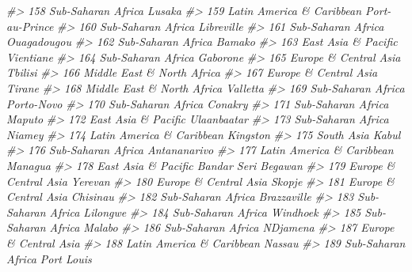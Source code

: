 \documentclass[
  xelatex, ja=standard]{bxjsbook}
\newenvironment{Shaded}{\begin{snugshade}}{\end{snugshade}}
\newcommand{\CommentTok}[1]{\textcolor[rgb]{0.56,0.35,0.01}{\textit{#1}}}
\theoremstyle{definition}
\theoremstyle{definition}
\theoremstyle{definition}
\theoremstyle{definition}
\theoremstyle{remark}
\begin{document}
\begin{Shaded}
\begin{Highlighting}[]
\CommentTok{\#\textgreater{} 158         Sub{-}Saharan Africa              Lusaka}
\CommentTok{\#\textgreater{} 159  Latin America \& Caribbean      Port{-}au{-}Prince}
\CommentTok{\#\textgreater{} 160         Sub{-}Saharan Africa          Libreville}
\CommentTok{\#\textgreater{} 161         Sub{-}Saharan Africa         Ouagadougou}
\CommentTok{\#\textgreater{} 162         Sub{-}Saharan Africa              Bamako}
\CommentTok{\#\textgreater{} 163        East Asia \& Pacific           Vientiane}
\CommentTok{\#\textgreater{} 164         Sub{-}Saharan Africa            Gaborone}
\CommentTok{\#\textgreater{} 165      Europe \& Central Asia             Tbilisi}
\CommentTok{\#\textgreater{} 166 Middle East \& North Africa                    }
\CommentTok{\#\textgreater{} 167      Europe \& Central Asia              Tirane}
\CommentTok{\#\textgreater{} 168 Middle East \& North Africa            Valletta}
\CommentTok{\#\textgreater{} 169         Sub{-}Saharan Africa          Porto{-}Novo}
\CommentTok{\#\textgreater{} 170         Sub{-}Saharan Africa             Conakry}
\CommentTok{\#\textgreater{} 171         Sub{-}Saharan Africa              Maputo}
\CommentTok{\#\textgreater{} 172        East Asia \& Pacific         Ulaanbaatar}
\CommentTok{\#\textgreater{} 173         Sub{-}Saharan Africa              Niamey}
\CommentTok{\#\textgreater{} 174  Latin America \& Caribbean            Kingston}
\CommentTok{\#\textgreater{} 175                 South Asia               Kabul}
\CommentTok{\#\textgreater{} 176         Sub{-}Saharan Africa        Antananarivo}
\CommentTok{\#\textgreater{} 177  Latin America \& Caribbean             Managua}
\CommentTok{\#\textgreater{} 178        East Asia \& Pacific Bandar Seri Begawan}
\CommentTok{\#\textgreater{} 179      Europe \& Central Asia             Yerevan}
\CommentTok{\#\textgreater{} 180      Europe \& Central Asia              Skopje}
\CommentTok{\#\textgreater{} 181      Europe \& Central Asia            Chisinau}
\CommentTok{\#\textgreater{} 182         Sub{-}Saharan Africa         Brazzaville}
\CommentTok{\#\textgreater{} 183         Sub{-}Saharan Africa            Lilongwe}
\CommentTok{\#\textgreater{} 184         Sub{-}Saharan Africa            Windhoek}
\CommentTok{\#\textgreater{} 185         Sub{-}Saharan Africa              Malabo}
\CommentTok{\#\textgreater{} 186         Sub{-}Saharan Africa           N\textquotesingle{}Djamena}
\CommentTok{\#\textgreater{} 187      Europe \& Central Asia                    }
\CommentTok{\#\textgreater{} 188  Latin America \& Caribbean              Nassau}
\CommentTok{\#\textgreater{} 189         Sub{-}Saharan Africa          Port Louis}

\end{Highlighting}
\end{Shaded}
\end{document}
